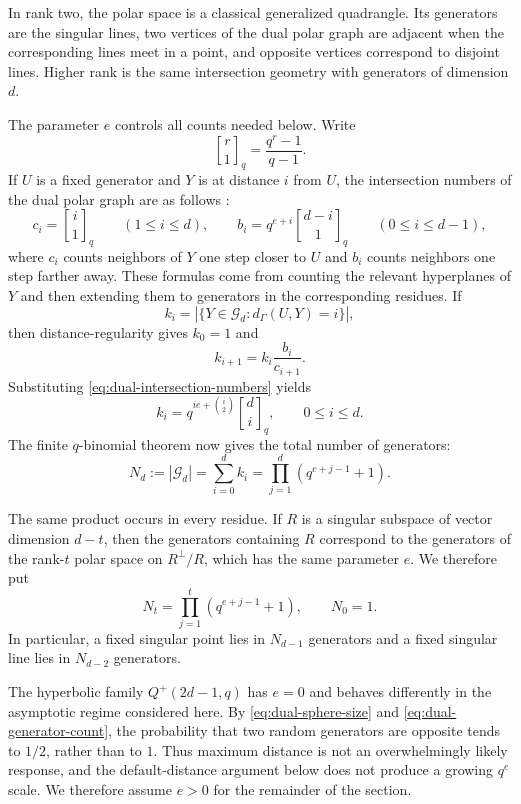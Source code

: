 \documentclass[11pt]{article}
\theoremstyle{definition}
\theoremstyle{remark}
\newcommand{\qbinom}[2]{\genfrac{[}{]}{0pt}{}{#1}{#2}_q}
\begin{document}
In rank two, the polar space is a classical generalized quadrangle.  Its
generators are the singular lines, two vertices of the dual polar graph 
are
adjacent when the corresponding lines meet in a point, and opposite 
vertices
correspond to disjoint lines.  Higher rank is the same intersection 
geometry
with generators of dimension $d$.

The parameter $e$ controls all counts needed below.  Write
\[
        \qbinom r1=\frac{q^r-1}{q-1}.
\]
If $U$ is a fixed generator and $Y$ is at distance $i$ from $U$, the
intersection numbers of the dual polar graph are as follows
\cite[Sec.~9.4.1]{BCN}:
\begin{equation}\label{eq:dual-intersection-numbers}
        c_i=\qbinom i1
        \qquad (1\leq i\leq d),
        \qquad
        b_i=q^{e+i}\qbinom{d-i}{1}
        \qquad (0\leq i\leq d-1),
\end{equation}
where $c_i$ counts neighbors of $Y$ one step closer to $U$ and $b_i$ 
counts
neighbors one step farther away.  These formulas come from counting the
relevant hyperplanes of $Y$ and then extending them to generators in the
corresponding residues.  If
\[
        k_i=|\{Y\in\mathcal G_d:d_\Gamma(U,Y)=i\}|,
\]
then distance-regularity gives $k_0=1$ and
\[
        k_{i+1}=k_i\frac{b_i}{c_{i+1}}.
\]
Substituting \eqref{eq:dual-intersection-numbers} yields
\begin{equation}\label{eq:dual-sphere-size}
        k_i=q^{ie+\binom i2}\qbinom di,
        \qquad 0\leq i\leq d.
\end{equation}
The finite $q$-binomial theorem now gives the total number of generators:
\begin{equation}\label{eq:dual-generator-count}
        N_d:=|\mathcal G_d|
        =\sum_{i=0}^d k_i
        =\prod_{j=1}^d(q^{e+j-1}+1).
\end{equation}

The same product occurs in every residue.  If $R$ is a singular subspace 
of
vector dimension $d-t$, then the generators containing $R$ correspond to 
the
generators of the rank-$t$ polar space on $R^\perp/R$, which has the same
parameter $e$.  We therefore put
\begin{equation}\label{eq:dual-residue-count}
        N_t=\prod_{j=1}^t(q^{e+j-1}+1),
        \qquad N_0=1.
\end{equation}
In particular, a fixed singular point lies in $N_{d-1}$ generators and a
fixed singular line lies in $N_{d-2}$ generators.

The hyperbolic family $Q^+(2d-1,q)$ has $e=0$ and behaves differently in 
the
asymptotic regime considered here.  By \eqref{eq:dual-sphere-size} and
\eqref{eq:dual-generator-count}, the probability that two random 
generators
are opposite tends to $1/2$, rather than to $1$.  Thus maximum distance is
not an overwhelmingly likely response, and the default-distance argument
below does not produce a growing $q^e$ scale.  We therefore assume $e>0$ 
for
the remainder of the section.
\end{document}
